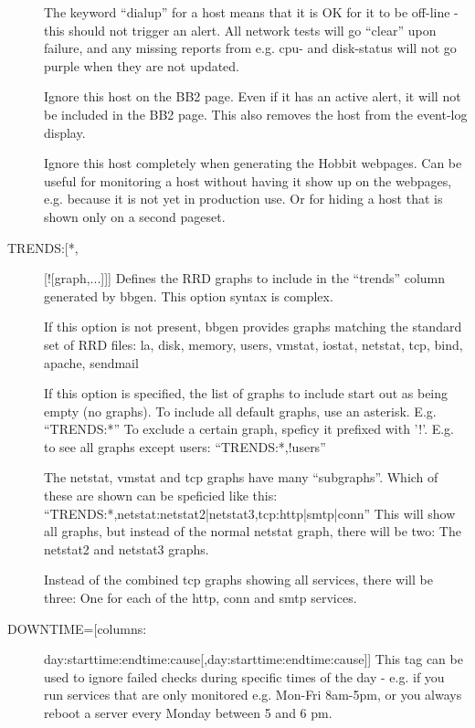 \begin{description}
 

\item[] The keyword ``dialup'' for a host means that it is OK
  for it to be off-line - this should not trigger an alert. All
  network tests will go ``clear'' upon failure, and any missing
  reports from e.g. cpu- and disk-status will not go purple when they
  are not updated. 


 

\item[] Ignore this host on the BB2 page. Even if it has an
  active alert, it will not be included in the BB2 page. This also
  removes the host from the event-log display. 


 

\item[] Ignore this host completely when generating the Hobbit
  webpages. Can be useful for monitoring a host without having it show
  up on the webpages, e.g. because it is not yet in production use. Or
  for hiding a host that is shown only on a second pageset. 


 

\item[TRENDS:[*,][![graph,...]]] Defines the RRD graphs to include in
  the ``trends'' column generated by bbgen. This option syntax is
  complex.  

 If this option is not present, bbgen provides graphs matching the
 standard set of RRD files: la, disk, memory, users, vmstat, iostat,
 netstat, tcp, bind, apache, sendmail  

 If this option is specified, the list of graphs to include start out as being empty (no graphs).  
 To include all default graphs, use an asterisk. E.g. ``TRENDS:*''  
 To exclude a certain graph, speficy it prefixed with '!'. E.g. to see
 all graphs except users: ``TRENDS:*,!users''  

 The netstat, vmstat and tcp graphs have many ``subgraphs''. Which of these are shown can be speficied like this:
 ``TRENDS:*,netstat:netstat2|netstat3,tcp:http|smtp|conn'' This will
 show all graphs, but instead of the normal netstat graph, there will
 be two: The netstat2 and netstat3 graphs. 

Instead of the combined tcp graphs showing all services, there will be three: One
 for each of the http, conn and smtp services. 


 

\item[DOWNTIME=[columns:]day:starttime:endtime:cause[,day:starttime:endtime:cause]]
  This tag can be used to ignore failed checks during specific times
  of the day - e.g. if you run services that are only monitored
  e.g. Mon-Fri 8am-5pm, or you always reboot a server every Monday
  between 5 and 6 pm. 



\end{description}
